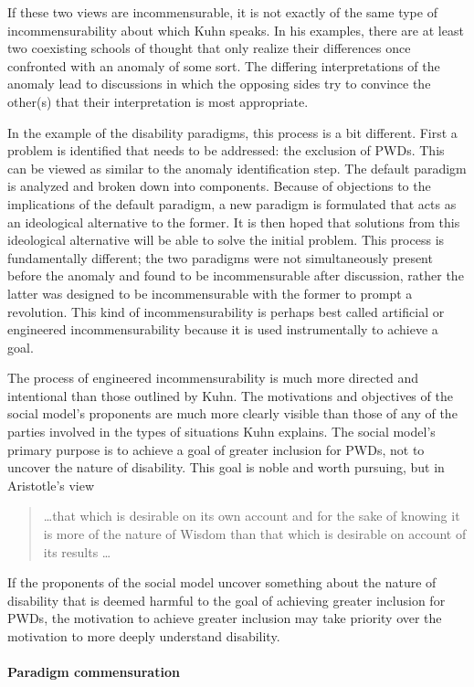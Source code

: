 \documentclass[a4paper]{article}
\begin{document}
If these two views are incommensurable, it is not exactly of the same type of
incommensurability about which Kuhn speaks. In his examples, there are at
least two coexisting schools of thought that only realize their differences
once confronted with an anomaly of some sort. The differing interpretations of
the anomaly lead to discussions in which the opposing sides try to convince
the other(s) that their interpretation is most appropriate.

In the example of the disability paradigms, this process is a bit different.
First a problem is identified that needs to be addressed: the exclusion of
PWDs. This can be viewed as similar to the anomaly identification step. The
default paradigm is analyzed and broken down into components. Because of
objections to the implications of the default paradigm, a new paradigm is
formulated that acts as an ideological alternative to the former. It is then
hoped that solutions from this ideological alternative will be able to solve
the initial problem. This process is fundamentally different; the two
paradigms were not simultaneously present before the anomaly and found to be
incommensurable after discussion, rather the latter was designed to be
incommensurable with the former to prompt a revolution. This kind of
incommensurability is perhaps best called artificial or engineered
incommensurability because it is used instrumentally to achieve a goal.

The process of engineered incommensurability is much more directed and
intentional than those outlined by Kuhn. The motivations and objectives of the
social model's proponents are much more clearly visible than those of any of
the parties involved in the types of situations Kuhn explains. The social
model's primary purpose is to achieve a goal of greater inclusion for PWDs,
not to uncover the nature of disability. This goal is noble and worth
pursuing, but in Aristotle's view
%
\begin{quote}
    \ldots that which is desirable on its own account and for the sake of
    knowing it is more of the nature of Wisdom than that which is desirable on
    account of its results \ldots
\end{quote}
%
If the proponents of the social model uncover something about the nature of
disability that is deemed harmful to the goal of achieving greater inclusion
for PWDs, the motivation to achieve greater inclusion may take priority over
the motivation to more deeply understand disability.

\paragraph{Paradigm commensuration}
\end{document}
